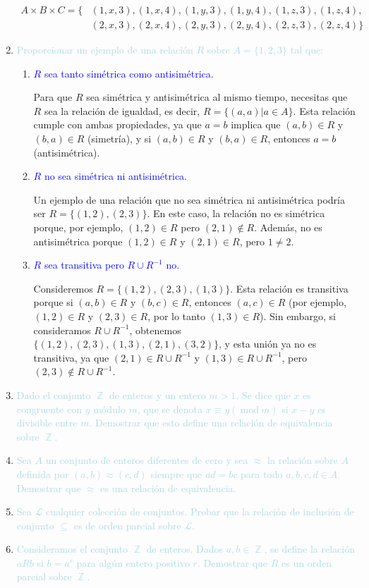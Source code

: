 \documentclass[12pt]{article}
\newcommand{\lb}[1]{\textcolor{lightblue}{#1}}
\newcommand{\db}[1]{\textcolor{blue}{#1}}
\DeclareMathOperator{\Z}{\mathbb{Z}}
\renewcommand{\mod}{~\mathrm{mod}~}
\begin{document}
\begin{enumerate}[label=\color{red}\textbf{\arabic*)},leftmargin=*]
      \[\begin{aligned}
      	A\times B\times C=\{&(1,x,3),(1,x,4),(1,y,3),(1,y,4),(1,z,3),(1,z,4),\\
      	&(2,x,3),(2,x,4),(2,y,3),(2,y,4),(2,z,3),(2,z,4)\}
      \end{aligned}\]
      \item \lb{Proporcionar un ejemplo de una relación $R$ sobre $A=\{1,2,3\}$ tal que:}
      \begin{enumerate}[label=\color{red}\alph*)]
      	\item \db{$R$ sea tanto simétrica como antisimétrica.}
      	
      	Para que $R$ sea simétrica y antisimétrica al mismo tiempo, necesitas que $R$ sea la relación de igualdad, es decir, $R=\{(a,a)|a\in A\}$. Esta relación cumple con ambas propiedades, ya que $a=b$ implica que $(a,b)\in R$ y $(b,a)\in R$ (simetría), y si $(a,b)\in R$ y $(b,a)\in R$, entonces $a=b$ (antisimétrica).
      	\item \db{$R$ no sea simétrica ni antisimétrica.}
      	
      	Un ejemplo de una relación que no sea simétrica ni antisimétrica podría ser $R=\{(1,2),(2,3)\}$. En este caso, la relación no es simétrica porque, por ejemplo, $(1,2)\in R$ pero $(2,1)\notin R$. Además, no es antisimétrica porque $(1,2)\in R$ y $(2,1)\in R$, pero $1\neq2$.
      	\item \db{$R$ sea transitiva pero $R\cup R^{-1}$ no.}
      	
      	Consideremos $R=\{(1,2),(2,3),(1,3)\}$. Esta relación es transitiva porque si $(a,b)\in R$ y $(b,c)\in R$, entonces $(a,c)\in R$ (por ejemplo, $(1,2)\in R$ y $(2,3)\in R$, por lo tanto $(1,3)\in R$). Sin embargo, si consideramos $R\cup R^{-1}$, obtenemos $\{(1,2),(2,3),(1,3),(2,1),(3,2)\}$, y esta unión ya no es transitiva, ya que $(2,1)\in R\cup R^{-1}$ y $(1,3)\in R\cup R^{-1}$, pero $(2,3)\notin R\cup R^{-1}$.
      \end{enumerate}
      \item \lb{Dado el conjunto $\Z$ de enteros y un entero $m>1$. Se dice que $x$ es congruente con $y$ módulo $m$, que se denota $x\equiv y(\mod m)$ si $x-y$ es divisible entre $m$. Demostrar que esto define una relación de equivalencia sobre $\Z$.}
      \item \lb{Sea $A$ un conjunto de enteros diferentes de cero y sea $\approx$ la relación sobre $A$ definida por $(a,b)\approx(c,d)$ siempre que $ad=bc$ para todo $a,b,c,d\in A$. Demostrar que $\approx$ es una relación de equivalencia.}
      \item \lb{Sea $\mathcal{L}$ cualquier colección de conjuntos. Probar que la relación de inclusión de conjunto $\subseteq$ es de orden parcial sobre $\mathcal{L}$.}
      \item \lb{Consideramos el conjunto $\Z$ de enteros. Dados $a,b\in\Z$, se define la relación $aRb$ si $b=a^r$ para algún entero positivo $r$. Demostrar que $R$ es un orden parcial sobre $\Z$.}
\end{enumerate}
\newpage
\end{document}
